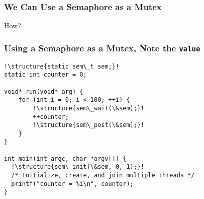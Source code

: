   \begin{frame}
    \frametitle{We Can Use a Semaphore as a Mutex}

    How?
  \end{frame}

  \begin{frame}[fragile]
    \frametitle{Using a Semaphore as a Mutex, Note the \texttt{value}}

    \begin{lstlisting}[escapechar=!]
!\structure{static sem\_t sem;}!
static int counter = 0;

void* run(void* arg) {
    for (int i = 0; i < 100; ++i) {
        !\structure{sem\_wait(\&sem);}!
        ++counter;
        !\structure{sem\_post(\&sem);}!
    }
}

int main(int argc, char *argv[]) {
  !\structure{sem\_init(\&sem, 0, 1);}!
  /* Initialize, create, and join multiple threads */
  printf("counter = %i\n", counter);
}
    \end{lstlisting}
  \end{frame}

